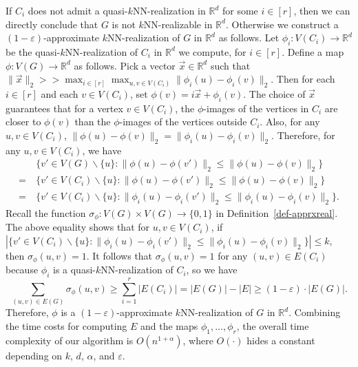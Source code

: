 \documentclass[11pt]{article}
\begin{document}
If $C_i$ does not admit a quasi-$k$NN-realization in $\mathbb{R}^d$ for some $i \in [r]$, then we can directly conclude that $G$ is not $k$NN-realizable in $\mathbb{R}^d$.
Otherwise we construct a $(1-\varepsilon)$-approximate $k$NN-realization of $G$ in $\mathbb{R}^d$ as follows.
Let $\phi_i:V(C_i) \rightarrow \mathbb{R}^d$ be the quasi-$k$NN-realization of $C_i$ in $\mathbb{R}^d$ we compute, for $i \in [r]$.
Define a map $\phi:V(G) \rightarrow \mathbb{R}^d$ as follows.
Pick a vector $\vec{x} \in \mathbb{R}^d$ such that $\lVert \vec{x} \rVert_2 >> \max_{i \in [r]} \max_{u,v \in V(C_i)} \lVert \phi_i(u) - \phi_i(v) \rVert_2$.
Then for each $i \in [r]$ and each $v \in V(C_i)$, set $\phi(v) = i \vec{x} + \phi_i(v)$.
The choice of $\vec{x}$ guarantees that for a vertex $v \in V(C_i)$, the $\phi$-images of the vertices in $C_i$ are closer to $\phi(v)$ than the $\phi$-images of the vertices outside $C_i$.
Also, for any $u,v \in V(C_i)$, $\lVert \phi(u) - \phi(v) \rVert_2 = \lVert \phi_i(u) - \phi_i(v) \rVert_2$.
Therefore, for any $u,v \in V(C_i)$, we have
\begin{align*}
    & \ \{v' \in V(G) \backslash \{u\}: \lVert \phi(u) - \phi(v') \rVert_2 \leq \lVert \phi(u) - \phi(v) \rVert_2\} \\
    = & \ \{v' \in V(C_i) \backslash \{u\}: \lVert \phi(u) - \phi(v') \rVert_2 \leq \lVert \phi(u) - \phi(v) \rVert_2\} \\
    = & \ \{v' \in V(C_i) \backslash \{u\}: \lVert \phi_i(u) - \phi_i(v') \rVert_2 \leq \lVert \phi_i(u) - \phi_i(v) \rVert_2\}.
\end{align*}
Recall the function $\sigma_\phi:V(G) \times V(G) \rightarrow \{0,1\}$ in Definition~\ref{def-apprxreal}.
The above equality shows that for $u,v \in V(C_i)$, if $|\{v' \in V(C_i) \backslash \{u\}: \lVert \phi_i(u) - \phi_i(v') \rVert_2 \leq \lVert \phi_i(u) - \phi_i(v) \rVert_2\}| \leq k$, then $\sigma_\phi(u,v) = 1$.
It follows that $\sigma_\phi(u,v) = 1$ for any $(u,v) \in E(C_i)$ because $\phi_i$ is a quasi-$k$NN-realization of $C_i$,
so we have
\begin{equation*}
    \sum_{(u,v) \in E(G)} \sigma_\phi(u,v) \geq \sum_{i=1}^r |E(C_i)| = |E(G)| - |E| \geq (1-\varepsilon) \cdot |E(G)|.
\end{equation*}
Therefore, $\phi$ is a $(1-\varepsilon)$-approximate $k$NN-realization of $G$ in $\mathbb{R}^d$.
Combining the time costs for computing $E$ and the maps $\phi_1,\dots,\phi_r$, the overall time complexity of our algorithm is $O(n^{1+\alpha})$, where $O(\cdot)$ hides a constant depending on $k$, $d$, $\alpha$, and $\varepsilon$.
\end{document}
